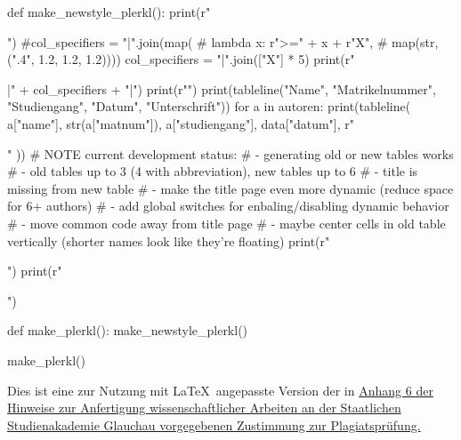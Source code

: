 \begin{pycode}
def make_newstyle_plerkl():
    print(r"\begin{table}[H]")
    #col_specifiers = "|".join(map(
    #    lambda x: r">{\hsize=" + x + r"\hsize}X",
    #    map(str, (".4", 1.2, 1.2, 1.2))))
    col_specifiers = "|".join(["X"] * 5)
    print(r"\begin{tabularx}{\linewidth}{|" + col_specifiers + "|}")
    print(r"\hline")
    print(tableline("Name", "Matrikelnummer", "Studiengang", "Datum", "Unterschrift"))
    for a in autoren:
        print(tableline(
            a["name"],
            str(a["matnum"]),
            a["studiengang"],
            data["datum"],
            r"\par"
        ))
    # NOTE current development status:
    # - generating old or new tables works
    # - old tables up to 3 (4 with abbreviation), new tables up to 6
    # - title is missing from new table
    # - make the title page even more dynamic (reduce space for 6+ authors)
    # - add global switches for enbaling/disabling dynamic behavior
    # - move common code away from title page
    # - maybe center cells in old table vertically (shorter names look like they're floating)
    print(r"\end{tabularx}")
    print(r"\end{table}")

def make_plerkl():
    make_newstyle_plerkl()

make_plerkl()
\end{pycode}
    


\vfill

{\footnotesize Dies ist eine zur Nutzung mit \LaTeX\ angepasste Version der in \href{https://www.ba-glauchau.de/fileadmin/glauchau/waehrend-des-studium/dokumente/pruefungen/4BA-F.207_Hinweise_zur_Anfertigung_wissenschaftlicher_Arbeiten.pdf}{Anhang 6 der Hinweise zur Anfertigung wissenschaftlicher Arbeiten an der Staatlichen Studienakademie Glauchau vorgegebenen Zustimmung zur Plagiatsprüfung.}}